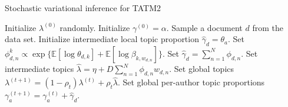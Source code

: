 \begin{algorithm}[tb]
\caption{Stochastic variational inference for TATM2}
\label{alg:stoch_tatm2}
\begin{algorithmic}[1]
	\STATE Initialize $\lambda^{(0)}$ randomly.
	\STATE Initialize $\gamma^{(0)} = \alpha$.
	\REPEAT
	\STATE Sample a document $d$ from the data set.
	\STATE Initialize intermediate local topic proportion $\hat{\gamma}_d = \theta_{a}$.
		\REPEAT
					\STATE Set $\phi^k_{d,n} \propto \exp \{ \mathbb{E}[\log \theta_{d,k}] + \mathbb{E}[\log \beta_{k,w_{d,n}}] \}$.
			\ENDFOR
			\STATE Set $\hat{\gamma}_d = \sum_{n=1}^{N}{\phi_{d,n}}$.
		\STATE Set intermediate topics $\hat{\lambda} = \eta + D \sum_{n=1}^{N}{\phi_{d,n}w_{d,n}}$.
		\STATE Set global topics $\lambda^{(t+1)} = (1 - \rho_t) \lambda^{(t)} + \rho_t \hat{\lambda}$.
		\STATE Set global per-author topic proportions $\gamma^{(t+1)}_a = \gamma^{(t)}_a + \hat{\gamma}_d$.
\end{algorithmic}
\end{algorithm}
